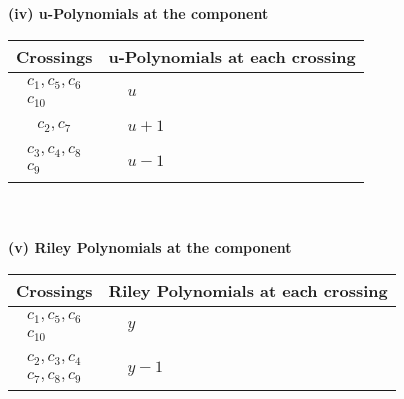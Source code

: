 \documentclass[1p]{elsarticle_modified}
\theoremstyle{definition}
\begin{document}
\newpage\renewcommand{\arraystretch}{1}
\flushleft \textbf{(iv) u-Polynomials at the component}\newline \\
\begin{tabular}{m{50pt}|m{274pt}}
Crossings & \hspace{64pt}u-Polynomials at each crossing \\
\hline $$\begin{aligned}c_{1},c_{5},c_{6}\\c_{10}\end{aligned}$$&$\begin{aligned}
&u
\end{aligned}$\\
\hline $$\begin{aligned}c_{2},c_{7}\end{aligned}$$&$\begin{aligned}
&u+1
\end{aligned}$\\
\hline $$\begin{aligned}c_{3},c_{4},c_{8}\\c_{9}\end{aligned}$$&$\begin{aligned}
&u-1
\end{aligned}$\\
\hline
\end{tabular}\\~\\
\newpage\renewcommand{\arraystretch}{1}
\flushleft \textbf{(v) Riley Polynomials at the component}\newline \\
\begin{tabular}{m{50pt}|m{274pt}}
Crossings & \hspace{64pt}Riley Polynomials at each crossing \\
\hline $$\begin{aligned}c_{1},c_{5},c_{6}\\c_{10}\end{aligned}$$&$\begin{aligned}
&y
\end{aligned}$\\
\hline $$\begin{aligned}c_{2},c_{3},c_{4}\\c_{7},c_{8},c_{9}\end{aligned}$$&$\begin{aligned}
&y-1
\end{aligned}$\\
\hline
\end{tabular}\\~\\
\end{document}
